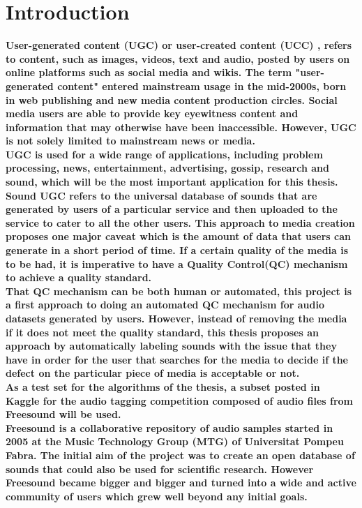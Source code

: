 \normallinespacing

\chapter{Introduction}

\bf User-generated content (UGC) \rm or \bf user-created content (UCC) \rm, refers to content, such as images, 
videos, text and audio, posted by users on online platforms such as social media and wikis. The term "user-generated content" 
entered mainstream usage in the mid-2000s, born in web publishing and new media content production circles. Social media users 
are able to provide key eyewitness content and information that may otherwise have been inaccessible. However, UGC is not solely 
limited to mainstream news or media.\\
UGC is used for a wide range of applications, including problem processing, news, entertainment, advertising, gossip, research 
and sound, which will be the most important application for this thesis. Sound UGC refers to the universal database of sounds 
that are generated by users of a particular service and then uploaded to the service to cater to all the other users. This 
approach to media creation proposes one major caveat which is the amount of data that users can generate in a short period 
of time. If a certain quality of the media is to be had, it is imperative to have a \bf Quality Control(QC) \rm mechanism to 
achieve a quality standard. \\
That QC mechanism can be both human or automated, this project is a first approach to doing an automated QC mechanism for audio 
datasets generated by users. However, instead of removing the media if it does not meet the quality standard, this thesis proposes 
an approach by automatically labeling sounds with the issue that they have in order for the user that searches for the media to 
decide if the defect on the particular piece of media is acceptable or not.\\
As a test set for the algorithms of the thesis, a subset posted in \bf Kaggle \rm for the \bf audio tagging competition \rm 
composed of audio files from \bf Freesound \rm will be used.\\ 
Freesound is a collaborative repository of audio samples started in 2005 at the Music Technology Group (MTG) of Universitat 
Pompeu Fabra. The initial aim of the project was to create an open database of sounds that could also be used for scientific 
research. However Freesound became bigger and bigger and turned into a wide and active community of users which grew well beyond 
any initial goals.\\

